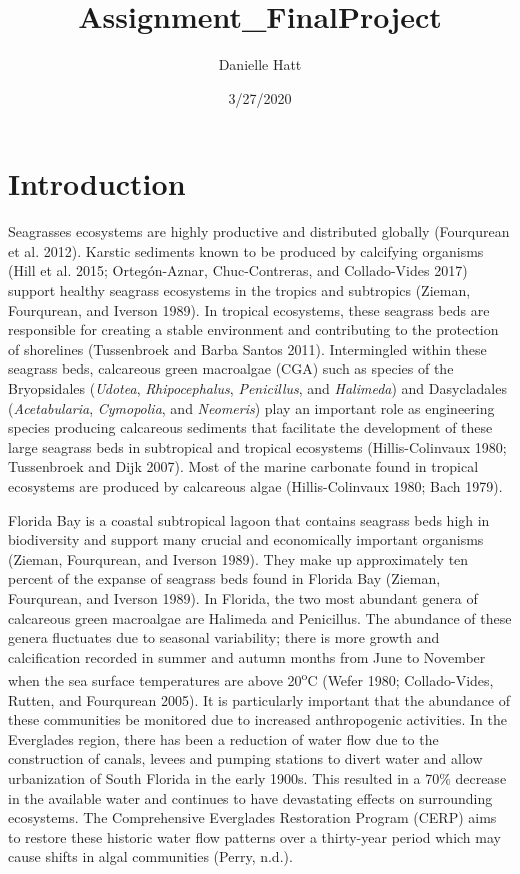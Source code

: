 \documentclass[]{article}
\title{Assignment\_FinalProject}
\author{Danielle Hatt}
\date{3/27/2020}
\begin{document}
\maketitle

\hypertarget{introduction}{%
\section{Introduction}\label{introduction}}

Seagrasses ecosystems are highly productive and distributed globally
(Fourqurean et al. 2012). Karstic sediments known to be produced by
calcifying organisms (Hill et al. 2015; Ortegón-Aznar, Chuc-Contreras,
and Collado-Vides 2017) support healthy seagrass ecosystems in the
tropics and subtropics (Zieman, Fourqurean, and Iverson 1989). In
tropical ecosystems, these seagrass beds are responsible for creating a
stable environment and contributing to the protection of shorelines
(Tussenbroek and Barba Santos 2011). Intermingled within these seagrass
beds, calcareous green macroalgae (CGA) such as species of the
Bryopsidales (\emph{Udotea}, \emph{Rhipocephalus}, \emph{Penicillus},
and \emph{Halimeda}) and Dasycladales (\emph{Acetabularia},
\emph{Cymopolia}, and \emph{Neomeris}) play an important role as
engineering species producing calcareous sediments that facilitate the
development of these large seagrass beds in subtropical and tropical
ecosystems (Hillis-Colinvaux 1980; Tussenbroek and Dijk 2007). Most of
the marine carbonate found in tropical ecosystems are produced by
calcareous algae (Hillis-Colinvaux 1980; Bach 1979).

Florida Bay is a coastal subtropical lagoon that contains seagrass beds
high in biodiversity and support many crucial and economically important
organisms (Zieman, Fourqurean, and Iverson 1989). They make up
approximately ten percent of the expanse of seagrass beds found in
Florida Bay (Zieman, Fourqurean, and Iverson 1989). In Florida, the two
most abundant genera of calcareous green macroalgae are Halimeda and
Penicillus. The abundance of these genera fluctuates due to seasonal
variability; there is more growth and calcification recorded in summer
and autumn months from June to November when the sea surface
temperatures are above 20\textsuperscript{o}C (Wefer 1980;
Collado-Vides, Rutten, and Fourqurean 2005). It is particularly
important that the abundance of these communities be monitored due to
increased anthropogenic activities. In the Everglades region, there has
been a reduction of water flow due to the construction of canals, levees
and pumping stations to divert water and allow urbanization of South
Florida in the early 1900s. This resulted in a 70\% decrease in the
available water and continues to have devastating effects on surrounding
ecosystems. The Comprehensive Everglades Restoration Program (CERP) aims
to restore these historic water flow patterns over a thirty-year period
which may cause shifts in algal communities (Perry, n.d.).
\end{document}
